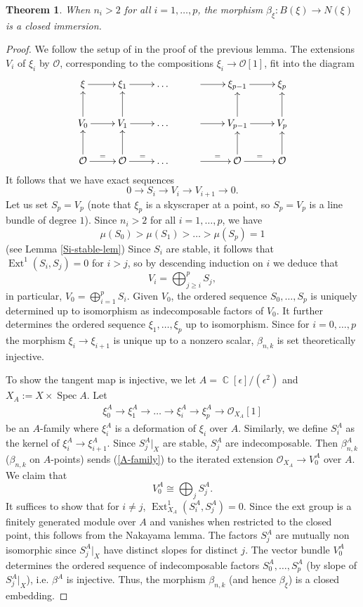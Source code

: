 \documentclass[reqno]{amsart}
\DeclareMathOperator\C{\mathbb C}
\newtheorem{theorem}{Theorem}[section]
\theoremstyle{definition}
\theoremstyle{remark}
\newcommand{\Ext}{\operatorname{Ext}}
\newcommand{\OO}{{\mathcal O}}
\newcommand{\Spec}{\operatorname{Spec}}
\newcommand{\eps}{\epsilon}
\newcommand{\cO}{\mathcal{O}}
\numberwithin{equation}{section}
\begin{document}
\begin{theorem}\label{thm:ni>2}
When $n_i>2$ for all $i=1,\ldots, p$, the morphism $\beta_\xi: B(\xi)\to N(\xi)$ is a closed immersion.
\end{theorem}
\begin{proof}
We follow the setup of in the proof of the previous lemma. The extensions $V_i$ of $\xi_i$ by $\OO$, corresponding to the compositions $\xi_i\to \OO[1]$, fit into the diagram
\begin{equation}\label{pullback}
\xymatrix{
\xi\ar[r] & \xi_1\ar[r] &\ldots &\ar[r] &\xi_{p-1}\ar[r] &\xi_p\\
 V_0\ar[r]\ar[u]  & V_1\ar[r]\ar[u]  &\ldots & \ar[r]   &V_{p-1}\ar[u] \ar[r]   &V_p\ar[u]\\
\cO\ar[u]\ar[r]^{=} &  \cO\ar[u]\ar[r]^{=} &\ldots & \ar[r]^= &\cO\ar[u]\ar[r]^= &\cO\ar[u] 
}
\end{equation} 
It follows that we have exact sequences
$$0\to S_i\to V_i\to V_{i+1}\to 0.$$
Let us set $S_p=V_p$ (note that $\xi_p$ is a skyscraper at a point, so $S_p=V_p$ is a line bundle of degree $1$).
Since $n_i>2$ for all $i=1,\ldots,p$, we have
\[
\mu(S_0)>\mu(S_1)>\ldots>\mu(S_p)=1
\] 
(see Lemma \ref{Si-stable-lem})
Since $S_i$ are stable, it follows that $\Ext^1(S_i,S_j)=0$ for $i>j$, so
by descending induction on $i$ we deduce that 
$$V_i=\bigoplus_{j\ge i}^p S_j,$$ 
in particular, $V_0=\bigoplus_{i=1}^p S_i$.
Given $V_0$, the ordered sequence $S_0,\ldots,S_p$ is uniquely determined up to isomorphism as indecomposable factors of $V_0$. It further determines the ordered sequence $\xi_1,\ldots,\xi_p$ up to isomorphism. Since for $i=0,\ldots, p$ the morphism $\xi_i\to \xi_{i+1}$ is unique up to a nonzero scalar, $\beta_{n,k}$ is set theoretically injective.

To show the tangent map is injective, we let $A=\C[\eps]/(\eps^2)$ and $X_{A}:=X\times \Spec A$. Let 
\begin{align}\label{A-family}
\xi_0^A\to \xi_1^A\to \ldots\to \xi_i^A \to \xi^A_p\to \cO_{X_A}[1]
\end{align}  be an $A$-family where  $\xi^{A}_i$ is a  deformation of $\xi_i$ over $A$.  Similarly, we define $S_i^A$ as the kernel of $\xi_i^A\to \xi^A_{i+1}$. Since $S_j^A|_X$ are stable, $S^A_j$ are indecomposable. Then $\beta_{n,k}^A$ ($\beta_{n,k}$ on $A$-points) sends  (\ref{A-family})
to the iterated extension $\cO_{X_A}\to V^A_0$ over $A$. We claim that 
\[
V_0^A\cong \bigoplus_{j} S^A_j.
\] 
It suffices to show that for $i\neq j$, $\Ext^1_{X_A}(S_i^A,S^A_j)=0$. Since the ext group is a finitely generated module over $A$ and vanishes when restricted to the closed point, this follows from the Nakayama lemma. The factors $S_j^A$ are mutually non isomorphic since $S^A_j|_X$ have distinct slopes for distinct $j$. The vector bundle $V_0^A$ determines the ordered sequence of indecomposable factors $S_0^A,\ldots,S_p^A$ (by slope of $S^A_j|_X$), i.e. $\beta^A$ is injective. 
Thus, the morphism $\beta_{n,k}$ (and hence $\beta_\xi$) is a closed embedding. 
\end{proof}
\end{document}
